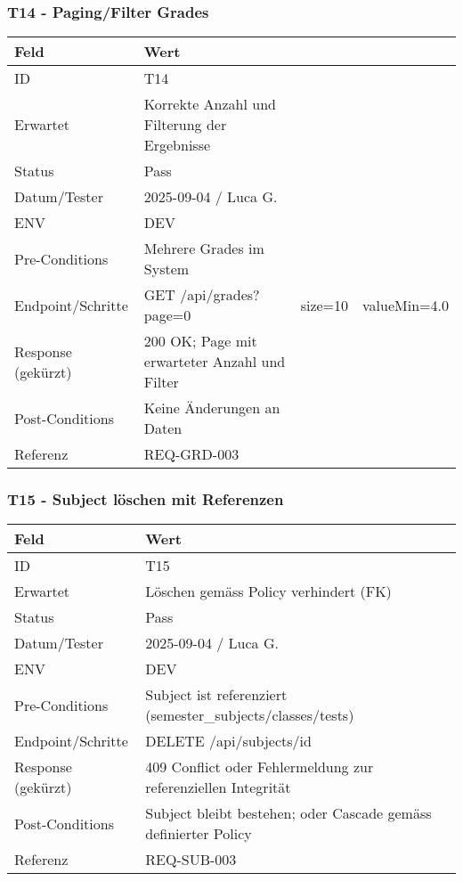 \documentclass[12pt,a4paper]{article}
\begin{document}
    \subsubsection{T14 - Paging/Filter Grades}
    {\small
        \begin{tabularx}{\textwidth}{|p{3.2cm}|X|}
            \hline
            \textbf{Feld} & \textbf{Wert} \\ \hline
            ID & T14 \\ \hline
            Erwartet & Korrekte Anzahl und Filterung der Ergebnisse \\ \hline
            Status & Pass \\ \hline
            Datum/Tester & 2025-09-04 / Luca G. \\ \hline
            ENV & DEV \\ \hline
            Pre-Conditions & Mehrere Grades im System \\ \hline
            Endpoint/Schritte & GET /api/grades?page=0&size=10&valueMin=4.0 \\ \hline
            Response (gekürzt) & 200 OK; Page mit erwarteter Anzahl und Filter \\ \hline
            Post-Conditions & Keine Änderungen an Daten \\ \hline
            Referenz & REQ-GRD-003 \\ \hline
        \end{tabularx}
    }

    \subsubsection{T15 - Subject löschen mit Referenzen}
    {\small
        \begin{tabularx}{\textwidth}{|p{3.2cm}|X|}
            \hline
            \textbf{Feld} & \textbf{Wert} \\ \hline
            ID & T15 \\ \hline
            Erwartet & Löschen gemäss Policy verhindert (FK) \\ \hline
            Status & Pass \\ \hline
            Datum/Tester & 2025-09-04 / Luca G. \\ \hline
            ENV & DEV \\ \hline
            Pre-Conditions & Subject ist referenziert (semester_subjects/classes/tests) \\ \hline
            Endpoint/Schritte & DELETE /api/subjects/{id} \\ \hline
            Response (gekürzt) & 409 Conflict oder Fehlermeldung zur referenziellen Integrität \\ \hline
            Post-Conditions & Subject bleibt bestehen; oder Cascade gemäss definierter Policy \\ \hline
            Referenz & REQ-SUB-003 \\ \hline
        \end{tabularx}
    }
\end{document}
